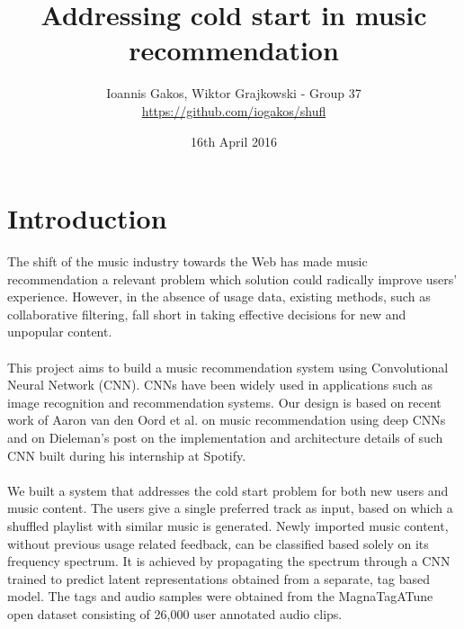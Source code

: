 \documentclass[11pt, a4paper]{article}
\begin{document}
  \title{Addressing cold start in music recommendation}
  \author{Ioannis Gakos, Wiktor Grajkowski - Group 37\\
      \url{https://github.com/iogakos/shufl}}
  \date{16th April 2016}
  \maketitle

  \section{Introduction}
    The shift of the music industry towards the Web has made music
    recommendation a relevant problem which solution could radically improve
    users' experience. However, in the absence of usage data, existing methods,
    such as collaborative filtering, fall short in taking effective decisions
    for new and unpopular content.
    \\ \\
    \noindent
    This project aims to build a music recommendation system using
    Convolutional Neural Network (CNN). CNNs have been widely used in
    applications such as image recognition and recommendation systems. Our
    design is based on recent work of Aaron van den Oord et al. on music
    recommendation \cite{deep-content-based-music-recommendation} using deep
    CNNs and on Dieleman's post \cite{spotify-dieleman} on the implementation
    and architecture details of such CNN built during his internship at
    Spotify.
    \\ \\
    \noindent
    We built a system that addresses the cold start problem for both new users
    and music content. The users give a single preferred track as input, based
    on which a shuffled playlist with similar music is generated. Newly
    imported music content, without previous usage related feedback, can be
    classified based solely on its frequency spectrum. It is achieved by
    propagating the spectrum through a CNN trained to predict latent
    representations obtained from a separate, tag based model. The tags and
    audio samples were obtained from the MagnaTagATune open dataset consisting
    of 26,000 user annotated audio clips.
\end{document}
